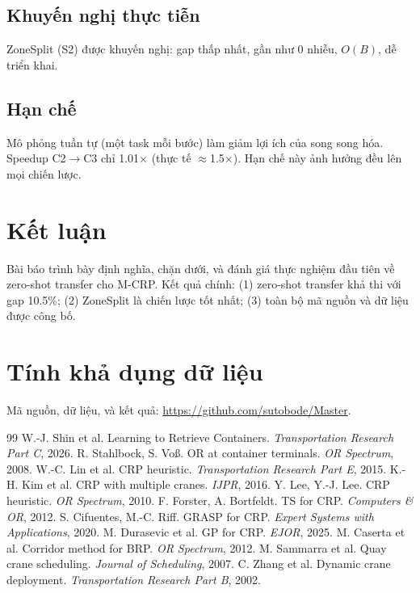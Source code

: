 \documentclass[11pt,a4paper]{elsarticle}
\begin{document}
\subsection{Khuyến nghị thực tiễn}
ZoneSplit (S2) được khuyến nghị: gap thấp nhất, gần như 0 nhiễu, $O(B)$, dễ triển khai.

\subsection{Hạn chế}
Mô phỏng tuần tự (một task mỗi bước) làm giảm lợi ích của song song hóa. Speedup C2$\to$C3 chỉ 1.01$\times$ (thực tế $\approx$1.5$\times$). Hạn chế này ảnh hưởng đều lên mọi chiến lược.

\section{Kết luận}
Bài báo trình bày định nghĩa, chặn dưới, và đánh giá thực nghiệm đầu tiên về zero-shot transfer cho M-CRP. Kết quả chính: (1) zero-shot transfer khả thi với gap 10.5\%; (2) ZoneSplit là chiến lược tốt nhất; (3) toàn bộ mã nguồn và dữ liệu được công bố.

\section*{Tính khả dụng dữ liệu}
Mã nguồn, dữ liệu, và kết quả: \url{https://github.com/sutobode/Master}.


\begin{thebibliography}{99}
 W.-J. Shin et al. Learning to Retrieve Containers. \textit{Transportation Research Part C}, 2026.
 R. Stahlbock, S. Vo\ss. OR at container terminals. \textit{OR Spectrum}, 2008.
 W.-C. Lin et al. CRP heuristic. \textit{Transportation Research Part E}, 2015.
 K.-H. Kim et al. CRP with multiple cranes. \textit{IJPR}, 2016.
 Y. Lee, Y.-J. Lee. CRP heuristic. \textit{OR Spectrum}, 2010.
 F. Forster, A. Bortfeldt. TS for CRP. \textit{Computers \& OR}, 2012.
 S. Cifuentes, M.-C. Riff. GRASP for CRP. \textit{Expert Systems with Applications}, 2020.
 M. Durasevic et al. GP for CRP. \textit{EJOR}, 2025.
 M. Caserta et al. Corridor method for BRP. \textit{OR Spectrum}, 2012.
 M. Sammarra et al. Quay crane scheduling. \textit{Journal of Scheduling}, 2007.
 C. Zhang et al. Dynamic crane deployment. \textit{Transportation Research Part B}, 2002.
\end{thebibliography}
\end{document}
